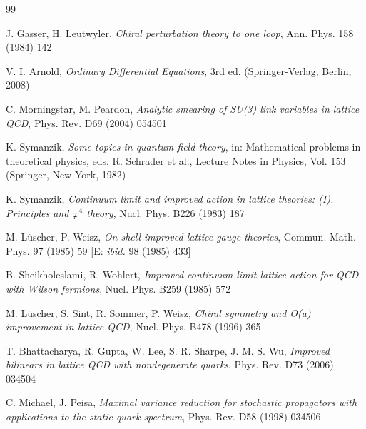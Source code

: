 \begin{thebibliography}{99}

J. Gasser, H. Leutwyler,
{\it Chiral perturbation theory to one loop},
Ann. Phys. 158 (1984) 142



V. I. Arnold,
{\it Ordinary Differential Equations}, 3rd ed. (Springer-Verlag, Berlin, 2008)



C. Morningstar, M. Peardon, 
{\it Analytic smearing of SU(3) link variables in lattice QCD},
Phys. Rev. D69 (2004) 054501



K. Symanzik, 
{\it Some topics in quantum field theory},
in: Mathematical problems in theoretical physics, eds. R. Schrader
et al., Lecture Notes in Physics, Vol. 153 (Springer, New York, 1982)

K. Symanzik,
{\it Continuum limit and improved action in lattice theories:
(I). Principles and $\varphi^4$ theory},
Nucl. Phys. B226 (1983) 187



M. L\"uscher, P. Weisz,
{\it On-shell improved lattice gauge theories},
Commun. Math. Phys. 97 (1985) 59 [E: {\it ibid.} 98 (1985) 433]



B. Sheikholeslami, R. Wohlert, 
{\it Improved continuum limit lattice action for QCD with Wilson fermions},
Nucl. Phys. B259 (1985) 572

M. L\"uscher, S. Sint, R. Sommer, P. Weisz,
{\it Chiral symmetry and O(a) improvement in lattice QCD},
Nucl. Phys. B478 (1996) 365



T. Bhattacharya, R. Gupta, W. Lee, S. R. Sharpe, J. M. S. Wu,
{\it Improved bilinears in lattice QCD with nondegenerate quarks},
Phys. Rev. D73 (2006) 034504



C. Michael, J. Peisa,
{\it Maximal variance reduction for stochastic propagators with 
applications to the static quark spectrum},
Phys. Rev. D58 (1998) 034506




\end{thebibliography}
